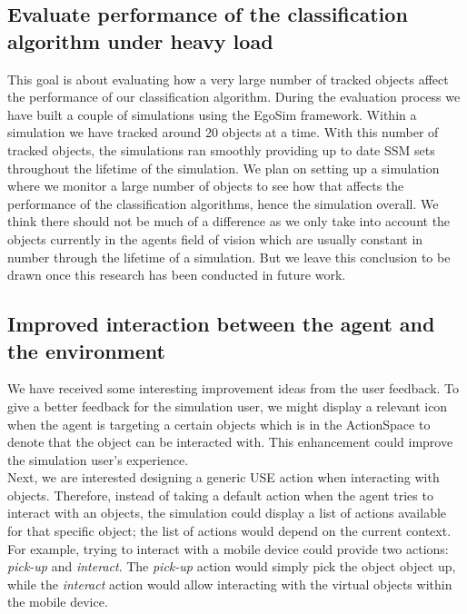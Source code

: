 \subsection{Evaluate performance of the classification algorithm under heavy load} 
This goal is about evaluating how a very large number of tracked objects affect the performance of our classification algorithm. During the evaluation process we have built a couple of simulations using the EgoSim framework. Within a simulation we have tracked around 20 objects at a time. With this number of tracked objects, the simulations ran smoothly providing up to date SSM sets throughout the lifetime of the simulation. We plan on setting up a simulation where we monitor a large number of objects to see how that affects the performance of the classification algorithms, hence the simulation overall. We think there should not be much of a difference as we only take into account the objects currently in the agents field of vision which are usually constant in number through the lifetime of a simulation. But we leave this conclusion to be drawn once this research has been conducted in future work.

\subsection{Improved interaction between the agent and the environment}
We have received some interesting improvement ideas from the user feedback. To give a better feedback for the simulation user, we might display a relevant icon when the agent is targeting a certain objects which is in the ActionSpace to denote that the object can be interacted with. This enhancement could improve the simulation user's experience.\\

Next, we are interested designing a generic USE action when interacting with objects. Therefore, instead of taking a default action when the agent tries to interact with an objects, the simulation could display a list of actions available for that specific object; the list of actions would depend on the current context. For example, trying to interact with a mobile device could provide two actions: \emph{pick-up} and \emph{interact}. The \emph{pick-up} action would simply pick the object object up, while the \emph{interact} action would allow interacting with the virtual objects within the mobile device.\\


